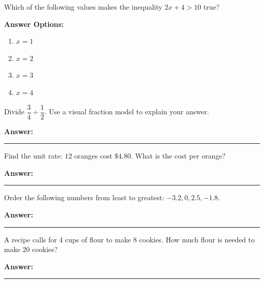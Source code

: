 \documentclass[12pt]{article}
\begin{document}
\begin{tcolorbox}[colframe=black!50, colback=white, title=\textbf{Problem 4}]
Which of the following values makes the inequality \(2x + 4 > 10\) true?

\textbf{Answer Options:}
\begin{enumerate}[label=(\Alph*), itemsep=0.5cm]
    \item \(x = 1\)
    \item \(x = 2\)
    \item \(x = 3\)
    \item \(x = 4\)
\end{enumerate}
\vspace{1cm}
\end{tcolorbox}

\begin{tcolorbox}[colframe=black!50, colback=white, title=\textbf{Problem 5}]
Divide \(\dfrac{3}{4} \div \dfrac{1}{2}\). Use a visual fraction model to explain your answer.

\vspace{3cm}
\textbf{Answer:} \rule{0.5\textwidth}{0.4mm}
\end{tcolorbox}

\begin{tcolorbox}[colframe=black!50, colback=white, title=\textbf{Problem 6}]
Find the unit rate: \(12\) oranges cost \(\$4.80\). What is the cost per orange?

\vspace{2cm}
\textbf{Answer:} \rule{0.5\textwidth}{0.4mm}
\end{tcolorbox}

\begin{tcolorbox}[colframe=black!50, colback=white, title=\textbf{Problem 7}]
Order the following numbers from least to greatest: \(-3.2, 0, 2.5, -1.8\).

\vspace{2cm}
\textbf{Answer:} \rule{0.5\textwidth}{0.4mm}
\end{tcolorbox}

\begin{tcolorbox}[colframe=black!50, colback=white, title=\textbf{Problem 8}]
A recipe calls for 4 cups of flour to make 8 cookies. How much flour is needed to make 20 cookies?

\vspace{2.5cm}
\textbf{Answer:} \rule{0.5\textwidth}{0.4mm}
\end{tcolorbox}
\end{document}
